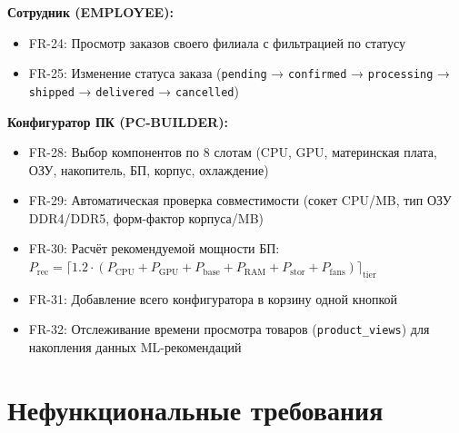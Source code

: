 \documentclass[14pt,a4paper]{extreport}
\begin{document}
\textbf{Сотрудник (EMPLOYEE):}
\begin{itemize}
  \item FR-24: Просмотр заказов своего филиала с фильтрацией по статусу
  \item FR-25: Изменение статуса заказа (\texttt{pending} → \texttt{confirmed} → \texttt{processing} → \texttt{shipped} → \texttt{delivered} → \texttt{cancelled})
\end{itemize}

\textbf{Конфигуратор ПК (PC-BUILDER):}
\begin{itemize}
  \item FR-28: Выбор компонентов по 8 слотам (CPU, GPU, материнская плата, ОЗУ, накопитель, БП, корпус, охлаждение)
  \item FR-29: Автоматическая проверка совместимости (сокет CPU/MB, тип ОЗУ DDR4/DDR5, форм-фактор корпуса/MB)
  \item FR-30: Расчёт рекомендуемой мощности БП: $P_\text{rec} = \lceil 1.2 \cdot (P_\text{CPU} + P_\text{GPU} + P_\text{base} + P_\text{RAM} + P_\text{stor} + P_\text{fans}) \rceil_\text{tier}$
  \item FR-31: Добавление всего конфигуратора в корзину одной кнопкой
  \item FR-32: Отслеживание времени просмотра товаров (\texttt{product\_views}) для накопления данных ML-рекомендаций
\end{itemize}

\section{Нефункциональные требования}

\begin{table}[h!]
\centering
\caption{Нефункциональные требования}
\end{table}
\end{document}
